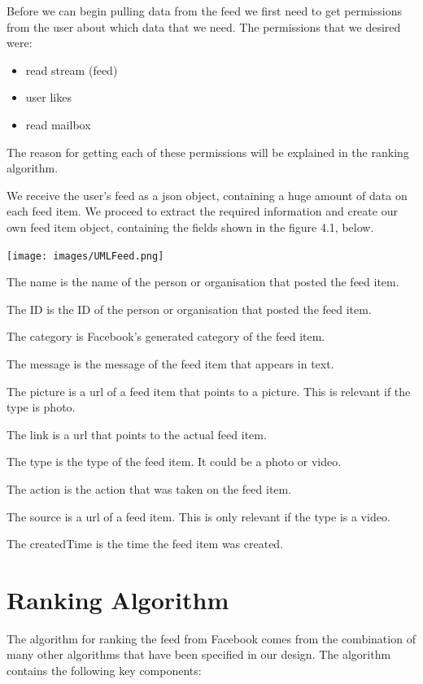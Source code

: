 Before we can begin pulling data from the feed we first need to get permissions from the user about which data that we need. The permissions that we desired were:

\begin{itemize}
	\item read stream (feed)
	\item user likes
	\item read mailbox
\end{itemize}

The reason for getting each of these permissions will be explained in the ranking algorithm.

We receive the user’s feed as a json object, containing a huge amount of data on each feed item. We proceed to extract the required information and create our own feed item object, containing the fields shown in the figure 4.1, below.

\begin{center}
\texttt{[image: images/UMLFeed.png]}
\end{center}

The name is the name of the person or organisation that posted the feed item. 

The ID is the ID of the person or organisation that posted the feed item.

The category is Facebook’s generated category of the feed item.

The message is the message of the feed item that appears in text.

The picture is a url of a feed item that points to a picture. This is relevant if the type is photo.

The link is a url that points to the actual feed item.

The type is the type of the feed item. It could be a photo or video.

The action is the action that was taken on the feed item.

The source is a url of a feed item. This is only relevant if the type is a video.

The createdTime is the time the feed item was created.

\newpage
\section{Ranking Algorithm}

The algorithm for ranking the feed from Facebook comes from the combination of many other algorithms that have been specified in our design. The algorithm contains the following key components:

